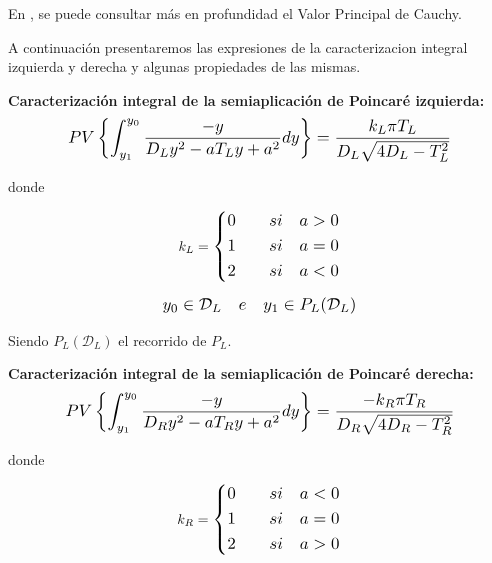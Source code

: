 \documentclass[12pt,a4paper]{report} %
\begin{document}
	\noindent En \cite{caracterizacion},\cite{pv} se puede consultar más en profundidad el Valor Principal de Cauchy.
	
	\vspace{1cm} A continuación presentaremos las expresiones de la caracterizacion integral izquierda y derecha y algunas propiedades de las mismas.
	
	\vspace{1cm}\noindent \textbf{Caracterización integral de la semiaplicación de Poincaré izquierda:}
	\begin{equation}
		\label{eq:caracl}
		\scalebox{1.2}{$\displaystyle
			PV\left\{\int_{y_1}^{y_0}\frac{-y}{D_Ly^2-aT_Ly+a^2}dy\right\}=\frac{k_L\pi T_L}{D_L\sqrt{4D_L-T_L^2}}
			$}
	\end{equation}\smallskip
	
	\noindent donde
	
	\begin{equation*}
		k_L=
		\label{eq:kl}
		\scalebox{1.2}{$\displaystyle
			\left\{
			\begin{aligned}
				0 \qquad si \quad a>0 \\
				1 \qquad si \quad a=0 \\
				2 \qquad si \quad a<0 
			\end{aligned}
			\right. 
			$}
	\end{equation*}\smallskip
	
	\vspace{0.5cm}
	
	\begin{equation*}
		\scalebox{1.2}{$\displaystyle
		y_0 \in \mathcal{D}_L \quad e \quad y_1\in P_L(\mathcal{D}_L)
		$}
	\end{equation*}\smallskip
	
	\noindent Siendo $ P_L(\mathcal{D}_L)$ el recorrido de $P_L$.
	
		\newpage
	
	\vspace{2cm}\noindent \textbf{Caracterización integral de la semiaplicación de Poincaré derecha:}
	\begin{equation}
		\label{eq:caracr}
		\scalebox{1.2}{$\displaystyle
			PV\left\{\int_{y_1}^{y_0}\frac{-y}{D_Ry^2-aT_Ry+a^2}dy\right\}=\frac{-k_R\pi T_R}{D_R\sqrt{4D_R-T_R^2}}
			$}
	\end{equation}\smallskip
	
	\noindent donde
	
	\begin{equation*}
		k_R=
		\label{eq:kr}
		\scalebox{1.2}{$\displaystyle
			\left\{
			\begin{aligned}
				0 \qquad si \quad a<0 \\
				1 \qquad si \quad a=0 \\
				2 \qquad si \quad a>0 
			\end{aligned}
			\right. 
			$}
	\end{equation*}\smallskip
	
\end{document}
